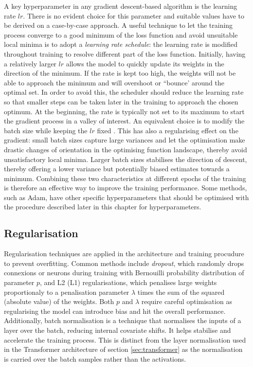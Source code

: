 A key hyperparameter in any gradient descent-based algorithm is the learning rate $lr$. There is no evident choice for this parameter and suitable values have to be derived on a case-by-case approach. A useful technique to let the training process converge to a good minimum of the loss function and avoid unsuitable local minima is to adopt a \textit{learning rate schedule}: the learning rate is modified throughout training to resolve different part of the loss function. Initially, having a relatively larger $lr$ allows the model to quickly update its weights in the direction of the minimum. If the rate is kept too high, the weights will not be able to approach the minimum and will overshoot or ``bounce' around the optimal set. In order to avoid this, the scheduler should reduce the learning rate so that smaller steps can be taken later in the training to approach the chosen optimum. At the beginning, the rate is typically not set to its maximum to start the gradient process in a valley of interest. An equivalent choice is to modify the batch size while keeping the $lr$ fixed \cite{smith2017decay}. This has also a regularising effect on the gradient: small batch sizes capture large variances and let the optimisation make drastic changes of orientation in the optimising function landscape, thereby avoid unsatisfactory local minima. Larger batch sizes stabilises the direction of descent, thereby offering a lower variance but potentially biased estimates towards a minimum. Combining these two characteristics at different epochs of the training is therefore an effective way to improve the training performance. Some methods, such as Adam, have other specific hyperparameters that should be optimised with the procedure described later in this chapter for hyperparameters.

\subsection{Regularisation}
Regularisation techniques are applied in the architecture and training procudure to prevent overfitting. Common methods include \textit{dropout}, which randomly drops connexions or neurons during training with Bernouilli probability distribution of parameter $p$, and L2 (L1) regularisations, which penalises large weights proportionaly to a penalisation parameter $\lambda$ times the sum of the squared (absolute value) of the weights. Both $p$ and $\lambda$ require careful optimisation as regularising the model can introduce bias and hit the overall performance. Additionally, batch normalisation is a technique that normalises the inputs of a layer over the batch, reducing internal covariate shifts. It helps stabilise and accelerate the training process. This is distinct from the layer normalisation used in the Transformer architecture of section \ref{sec:transformer} as the normalisation is carried over the batch samples rather than the activations. 

